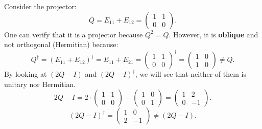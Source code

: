 \begin{example}
    Consider the projector:
    \begin{equation}
        Q = E_{11} + E_{12} = \begin{pmatrix}
            1 & 1\\
            0 & 0
        \end{pmatrix}.
    \end{equation}
    One can verify that it is a projector because $Q^2 = Q$. However, it is \textbf{oblique} and not orthogonal (Hermitian) because:
    \begin{equation}
        Q^\dagger = \left(E_{11} + E_{12}\right)^\dagger = E_{11} + E_{21} = \begin{pmatrix}
            1 & 1\\
            0 & 0
        \end{pmatrix}^\dagger = \begin{pmatrix}
            1 & 0\\
            1 & 0
        \end{pmatrix} \neq Q.
    \end{equation}
    By looking at $(2Q - I)$ and $(2Q - I)^\dagger$, we will see that neither of them is unitary nor Hermitian.
    \begin{equation}
        2Q - I = 2 \cdot\begin{pmatrix}
            1 & 1\\
            0 & 0
        \end{pmatrix} - \begin{pmatrix}
            1 & 0\\
            0 & 1
        \end{pmatrix} = \begin{pmatrix}
            1 & 2\\
            0 & -1
        \end{pmatrix}.
    \end{equation}
    \begin{equation}
        (2Q-I)^\dagger = \begin{pmatrix}
            1 & 0\\
            2 & -1
        \end{pmatrix} \neq \left(2Q - I\right).
    \end{equation}
\end{example}

